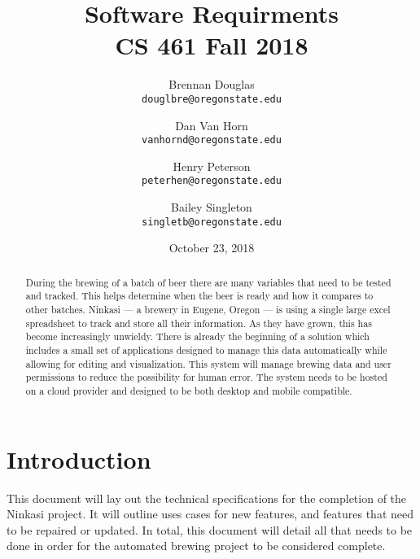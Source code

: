 \documentclass[draftclsnofoot,onecolumn,journal,letterpaper,compsoc,10pt]{IEEEtran}
\date{October 23, 2018}
\begin{document}
\begin{titlingpage}
    \title{Software Requirments\\\large CS 461 Fall 2018}
    \author{
        Brennan Douglas \\
        \texttt{douglbre@oregonstate.edu} \\
        \and
        Dan Van Horn \\
        \texttt{vanhornd@oregonstate.edu} \\
        \and
        Henry Peterson \\
        \texttt{peterhen@oregonstate.edu} \\
        \and
        Bailey Singleton \\
        \texttt{singletb@oregonstate.edu} \\
    }
    \maketitle
    \begin{abstract}
    	During the brewing of a batch of beer there are many variables that need to be tested and tracked. This helps determine when the beer is ready and how it compares to other batches. Ninkasi --- a brewery in Eugene, Oregon --- is using a single large excel spreadsheet to track and store all their information. As they have grown, this has become increasingly unwieldy. There is already the beginning of a solution which includes a small set of applications designed to manage this data automatically while allowing for editing and visualization. This system will manage brewing data and user permissions to reduce the possibility for human error. The system needs to be hosted on a cloud provider and designed to be both desktop and mobile compatible.
    \end{abstract}
    \pagebreak
    \tableofcontents
\end{titlingpage}

\section{Introduction}

This document will lay out the technical specifications for the completion of the Ninkasi project.  It will outline uses cases for new features, and features that need to be repaired or updated.  In total, this document will detail all that needs to be done in order for the automated brewing project to be considered complete.
\end{document}
